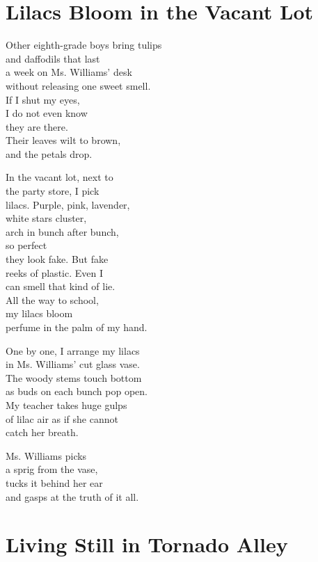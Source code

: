 \documentclass[twoside,10pt]{book}
\begin{document}
\clearpage
\section{Lilacs Bloom in the Vacant Lot}

Other eighth-grade boys bring tulips\\
and daffodils that last\\
a week on Ms. Williams' desk\\
without releasing one sweet smell.\\
If I shut my eyes,\\
I do not even know\\
they are there.\\
Their leaves wilt to brown,\\
and the petals drop.

In the vacant lot, next to\\
the party store, I pick\\
lilacs. Purple, pink, lavender,\\
white stars cluster,\\
arch in bunch after bunch,\\
so perfect\\
they look fake. But fake\\
reeks of plastic. Even I\\
can smell that kind of lie.\\
All the way to school,\\
my lilacs bloom\\
perfume in the palm of my hand.

One by one, I arrange my lilacs\\
in Ms. Williams' cut glass vase.\\
The woody stems touch bottom\\
as buds on each bunch pop open.\\
My teacher takes huge gulps\\
of lilac air as if she cannot\\
catch her breath.

Ms. Williams picks\\
a sprig from the vase,\\
tucks it behind her ear\\
and gasps at the truth of it all.


\clearpage
\section{Living Still in Tornado Alley}
\end{document}
